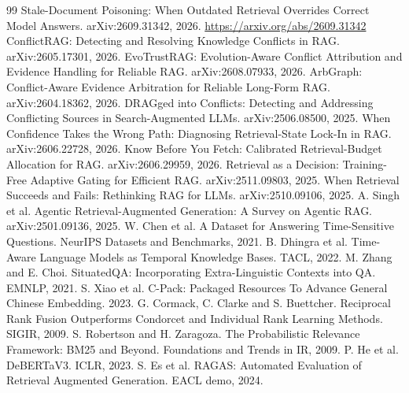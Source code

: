 \documentclass[11pt,a4paper]{report}
\begin{document}
\begin{thebibliography}{99}\small
{} Stale-Document Poisoning: When Outdated Retrieval Overrides Correct Model Answers. arXiv:2609.31342, 2026. \url{https://arxiv.org/abs/2609.31342}
 ConflictRAG: Detecting and Resolving Knowledge Conflicts in RAG. arXiv:2605.17301, 2026.
 EvoTrustRAG: Evolution-Aware Conflict Attribution and Evidence Handling for Reliable RAG. arXiv:2608.07933, 2026.
 ArbGraph: Conflict-Aware Evidence Arbitration for Reliable Long-Form RAG. arXiv:2604.18362, 2026.
 DRAGged into Conflicts: Detecting and Addressing Conflicting Sources in Search-Augmented LLMs. arXiv:2506.08500, 2025.
 When Confidence Takes the Wrong Path: Diagnosing Retrieval-State Lock-In in RAG. arXiv:2606.22728, 2026.
 Know Before You Fetch: Calibrated Retrieval-Budget Allocation for RAG. arXiv:2606.29959, 2026.
 Retrieval as a Decision: Training-Free Adaptive Gating for Efficient RAG. arXiv:2511.09803, 2025.
 When Retrieval Succeeds and Fails: Rethinking RAG for LLMs. arXiv:2510.09106, 2025.
 A. Singh et al. Agentic Retrieval-Augmented Generation: A Survey on Agentic RAG. arXiv:2501.09136, 2025.
 W. Chen et al. A Dataset for Answering Time-Sensitive Questions. NeurIPS Datasets and Benchmarks, 2021.
 B. Dhingra et al. Time-Aware Language Models as Temporal Knowledge Bases. TACL, 2022.
 M. Zhang and E. Choi. SituatedQA: Incorporating Extra-Linguistic Contexts into QA. EMNLP, 2021.
 S. Xiao et al. C-Pack: Packaged Resources To Advance General Chinese Embedding. 2023.
 G. Cormack, C. Clarke and S. Buettcher. Reciprocal Rank Fusion Outperforms Condorcet and Individual Rank Learning Methods. SIGIR, 2009.
 S. Robertson and H. Zaragoza. The Probabilistic Relevance Framework: BM25 and Beyond. Foundations and Trends in IR, 2009.
 P. He et al. DeBERTaV3. ICLR, 2023.
 S. Es et al. RAGAS: Automated Evaluation of Retrieval Augmented Generation. EACL demo, 2024.
\end{thebibliography}
\end{document}
